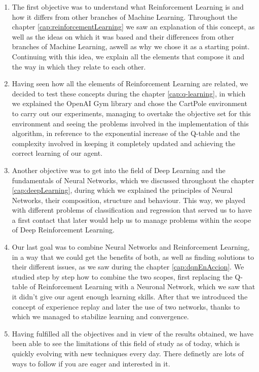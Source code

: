 \begin{enumerate}
        \item The first objective was to understand what Reinforcement Learning is and how it differs from other branches of Machine Learning. Throughout the chapter \ref{cap:reinforcementLearning} we saw an explanation of this concept, as well as the ideas on which it was based and their differences from other branches of Machine Learning, aswell as why we chose it as a starting point. Continuing with this idea, we explain all the elements that compose it and the way in which they relate to each other.
        \item Having seen how all the elements of Reinforcement Learning are related, we decided to test these concepts during the chapter \ref{cap:q-learning}, in which we explained the OpenAI Gym library and chose the CartPole environment to carry out our experiments, managing to overtake the objective set for this environment and seeing the problems involved in the implementation of this algorithm, in reference to the exponential increase of the Q-table and the complexity involved in keeping it completely updated and achieving the correct learning of our agent.
        \item Another objective was to get into the field of Deep Learning and the fundamentals of Neural Networks, which we discussed throughout the chapter \ref{cap:deepLearning}, during which we explained the principles of Neural Networks, their composition, structure and behaviour. This way, we played with different problems of classification and regression that served us to have a first contact that later would help us to manage problems within the scope of Deep Reinforcement Learning.
        \item Our last goal was to combine Neural Networks and Reinforcement Learning, in a way that we could get the benefits of both, as well as finding solutions to their different issues, as we saw during the chapter \ref{cap:dqnEnAccion}. We studied step by step how to combine the two scopes, first replacing the Q-table of Reinforcement Learning with a Neuronal Network, which we saw that it didn't give our agent enough learning skills. After that we introduced the concept of experience replay and later the use of two networks, thanks to which we managed to stabilize learning and convergence.
        \item Having fulfilled all the objectives and in view of the results obtained, we have been able to see the limitations of this field of study as of today, which is quickly evolving with new techniques every day. There definetly are lots of ways to follow if you are eager and interested in it.
\end{enumerate}

